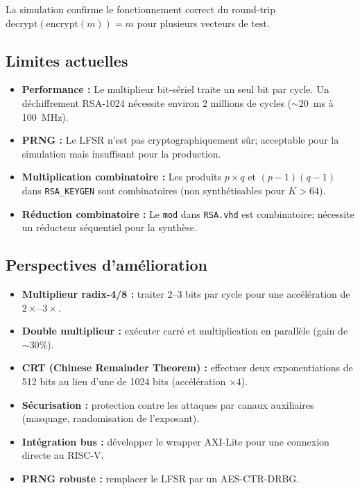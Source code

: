 \documentclass[12pt,a4paper]{report}
\begin{document}
La simulation confirme le fonctionnement correct du round-trip
$\text{decrypt}(\text{encrypt}(m)) = m$ pour plusieurs vecteurs de test.


\subsection{Limites actuelles}
\begin{itemize}
  \item \textbf{Performance :} Le multiplieur bit-sériel traite un seul
        bit par cycle. Un déchiffrement RSA-1024 nécessite environ
        2 millions de cycles ($\sim 20$~ms à 100~MHz).
  \item \textbf{PRNG :} Le LFSR n'est pas cryptographiquement sûr;
        acceptable pour la simulation mais insuffisant pour la production.
  \item \textbf{Multiplication combinatoire :} Les produits $p \times q$
        et $(p-1)(q-1)$ dans \texttt{RSA\_KEYGEN} sont combinatoires
        (non synthétisables pour $K > 64$).
  \item \textbf{Réduction combinatoire :} Le \texttt{mod} dans
        \texttt{RSA.vhd} est combinatoire; nécessite un réducteur
        séquentiel pour la synthèse.
\end{itemize}

\subsection{Perspectives d'amélioration}
\begin{itemize}
  \item \textbf{Multiplieur radix-4/8 :} traiter 2--3 bits par cycle
        pour une accélération de $2\times$--$3\times$.
  \item \textbf{Double multiplieur :} exécuter carré et multiplication
        en parallèle (gain de $\sim 30\%$).
  \item \textbf{CRT (Chinese Remainder Theorem) :} effectuer deux
        exponentiations de 512 bits au lieu d'une de 1024 bits
        (accélération $\times 4$).
  \item \textbf{Sécurisation :} protection contre les attaques par
        canaux auxiliaires (masquage, randomisation de l'exposant).
  \item \textbf{Intégration bus :} développer le wrapper AXI-Lite
        pour une connexion directe au RISC-V.
  \item \textbf{PRNG robuste :} remplacer le LFSR par un AES-CTR-DRBG.
\end{itemize}
\end{document}
